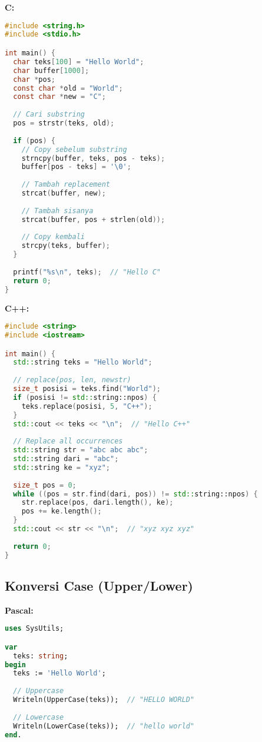 \documentclass[../main.tex]{subfiles}
\begin{document}
\textbf{C:}
\begin{lstlisting}[language=C, caption={Replace di C (manual)}]
#include <string.h>
#include <stdio.h>

int main() {
  char teks[100] = "Hello World";
  char buffer[1000];
  char *pos;
  const char *old = "World";
  const char *new = "C";
  
  // Cari substring
  pos = strstr(teks, old);
  
  if (pos) {
    // Copy sebelum substring
    strncpy(buffer, teks, pos - teks);
    buffer[pos - teks] = '\0';
    
    // Tambah replacement
    strcat(buffer, new);
    
    // Tambah sisanya
    strcat(buffer, pos + strlen(old));
    
    // Copy kembali
    strcpy(teks, buffer);
  }
  
  printf("%s\n", teks);  // "Hello C"
  return 0;
}
\end{lstlisting}

\textbf{C++:}
\begin{lstlisting}[language=C++, caption={Replace di C++}]
#include <string>
#include <iostream>

int main() {
  std::string teks = "Hello World";
  
  // replace(pos, len, newstr)
  size_t posisi = teks.find("World");
  if (posisi != std::string::npos) {
    teks.replace(posisi, 5, "C++");
  }
  std::cout << teks << "\n";  // "Hello C++"
  
  // Replace all occurrences
  std::string str = "abc abc abc";
  std::string dari = "abc";
  std::string ke = "xyz";
  
  size_t pos = 0;
  while ((pos = str.find(dari, pos)) != std::string::npos) {
    str.replace(pos, dari.length(), ke);
    pos += ke.length();
  }
  std::cout << str << "\n";  // "xyz xyz xyz"
  
  return 0;
}
\end{lstlisting}

\subsection{Konversi Case (Upper/Lower)}

\textbf{Pascal:}
\begin{lstlisting}[language=Pascal, caption={Case conversion di Pascal}]
uses SysUtils;

var
  teks: string;
begin
  teks := 'Hello World';
  
  // Uppercase
  Writeln(UpperCase(teks));  // "HELLO WORLD"
  
  // Lowercase
  Writeln(LowerCase(teks));  // "hello world"
end.
\end{lstlisting}
\end{document}

